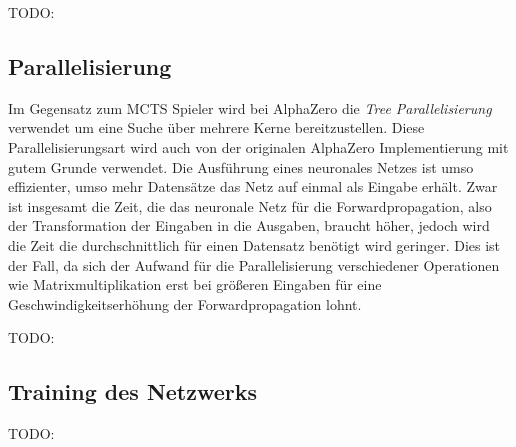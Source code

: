 TODO:

\subsection{Parallelisierung}

Im Gegensatz zum \ac{MCTS} Spieler wird bei AlphaZero die \emph{Tree Parallelisierung} verwendet um eine Suche über mehrere Kerne bereitzustellen. Diese Parallelisierungsart wird auch von der originalen AlphaZero Implementierung mit gutem Grunde verwendet. Die Ausführung eines neuronales Netzes ist umso effizienter, umso mehr Datensätze das Netz auf einmal als Eingabe erhält. Zwar ist insgesamt die Zeit, die das neuronale Netz für die Forwardpropagation, also der Transformation der Eingaben in die Ausgaben, braucht höher, jedoch wird die Zeit die durchschnittlich für einen Datensatz benötigt wird geringer. Dies ist der Fall, da sich der Aufwand für die Parallelisierung verschiedener Operationen wie Matrixmultiplikation erst bei größeren Eingaben für eine Geschwindigkeitserhöhung der Forwardpropagation lohnt.

TODO:

\subsection{Training des Netzwerks}

TODO: